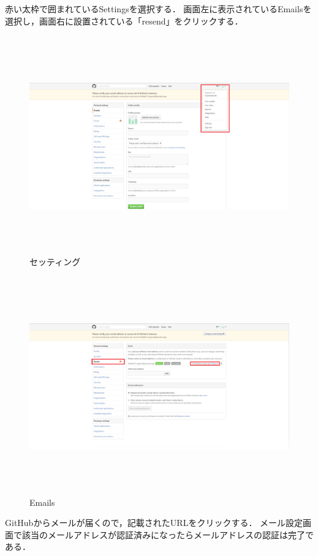 \newpage
赤い太枠で囲まれているSettingsを選択する．
画面左に表示されているEmailsを選択し，画面右に設置されている「resend」をクリックする．


\begin{figure}[htb]
\centering　
\includegraphics[height=8.5cm,width=13cm]{setting.PNG}
\caption{セッティング}
\end{figure}
 
 
\begin{figure}[htb]
\centering　
\includegraphics[height=8.5cm,width=13cm]{mail.PNG}
\caption{Emails}
\end{figure}

\newpage
GitHubからメールが届くので，記載されたURLをクリックする．
メール設定画面で該当のメールアドレスが認証済みになったらメールアドレスの認証は完了である．


